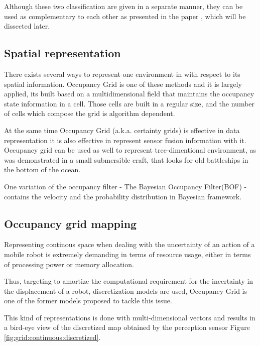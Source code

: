Although these two classification are given in a separate manner, they can be used as complementary to each other as presented in the paper \cite{Wang04a}, which will be dissected later.

\subsection{Spatial representation}

There exists several ways to represent one environment in with respect to its spatial information. Occupancy Grid is one of these methods and it is largely applied, its built based on a multidimensional field that maintains the occupancy state information in a cell\cite{Elfes:1989:UOG:68491.68495}. Those cells are built in a regular size, and the number of cells which compose the grid is algorithm dependent.

At the same time Occupancy Grid (a.k.a. certainty grids) is effective in data representation it is also effective in represent sensor fusion information with it. Occupancy grid can be used as well to represent tree-dimentional environment, as was demonstrated in a small submersible craft, that looks for old battleships in the bottom of the ocean\cite{DBLP:journals/aim/Moravec88}.

One variation of the occupancy filter - The Bayesian Occupancy Filter(BOF) - contains the velocity and the probability distribution in Bayesian framework.

\subsection{Occupancy grid mapping}

Representing continous space when dealing with the uncertainty of an action of a mobile robot is extremely demanding in terms of resource usage, either in terms of processing power or memory allocation.

Thus, targeting to amortize the computational requirement for the incertainty in the displacement of a robot, discretization models are used, Occupancy Grid\cite{Elfes:1989:UOG:68491.68495} is one of the former models proposed to tackle this issue.

This kind of representations is done with multi-dimensional vectors and results in a bird-eye view of the discretized map obtained by the perception sensor Figure \ref{fig:grid:continuous:discretized}.


